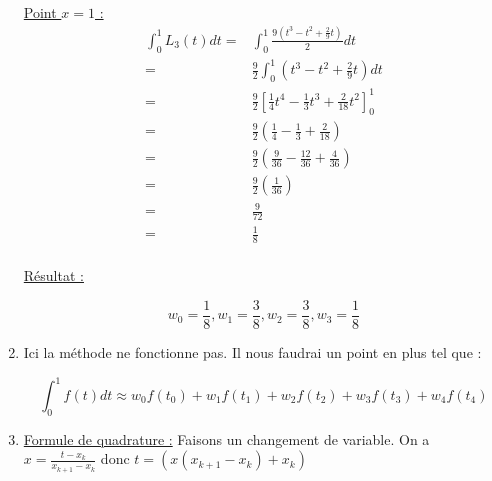 \documentclass[12pt, letterpaper]{article}
\begin{document}
\begin{enumerate}
\underline{Point $x = 1$ :}
\begin{equation*}
  \begin{split}
    \int_0^1 {L_3(t) dt} = & \int_0^1 {\frac{ 9 (t^3 - t^2 + \frac{2}{9} t)}
    {2} dt}
    \\
    = & \frac{9}{2} \int_0^1 { \left(t^3 - t^2 + \frac{2}{9} t \right) dt}
    \\
    = & \frac{9}{2} \left[ \frac{1}{4}t^4 - \frac{1}{3}t^3 +
      \frac{2}{18} t^2 \right]_0^1
    \\
    = & \frac{9}{2} \left(\frac{1}{4} - \frac{1}{3} +
      \frac{2}{18} \right)
    \\
    = & \frac{9}{2} \left( \frac{9}{36} - \frac{12}{36} +
      \frac{4}{36} \right)
    \\
    = & \frac{9}{2} \left( \frac{1}{36} \right)
    \\
    = & \frac{9}{72}
    \\
    = & \frac{1}{8}
    \\
  \end{split}
\end{equation*}

\underline{Résultat :}

\begin{equation*}
    w_0 = \frac{1}{8},
    w_1 = \frac{3}{8},
    w_2 = \frac{3}{8},
    w_3 = \frac{1}{8}
\end{equation*}

\item Ici la méthode ne fonctionne pas. \newline
  Il nous faudrai un point en plus tel que :

  \begin{equation*}
    \int_0^1 {f(t) dt} \approx w_0 f(t_0) + w_1 f(t_1) + w_2 f(t_2) +
    w_3 f(t_3) + w_4 f(t_4)
  \end{equation*}
  
\item \underline{Formule de quadrature :}
  Faisons un changement de variable. \newline
  On a $x = \frac{t - x_k}{x_{k + 1} - x_k}$ donc $t = (x (x_{k + 1} -
  x_k) + x_k )$
  

\end{enumerate}
\end{document}
